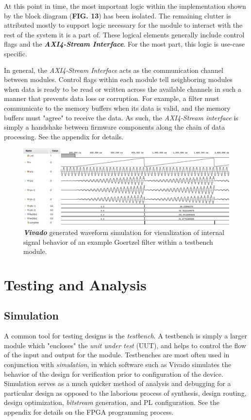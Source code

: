 \documentclass[reprint,amsmath,amssymb]{revtex4-2}
\begin{document}
At this point in time, the most important logic within the implementation shown by the block diagram (\textbf{FIG. 13}) has been isolated. The remaining clutter is attributed mostly to support logic necessary for the module to interact with the rest of the system it is a part of. These logical elements generally include control flags and the \textit{\textbf{AXI4-Stream Interface}}. For the most part, this logic is use-case specific.

In general, the \textit{AXI4-Stream Interface} acts as the communication channel between modules. Control flags within each module tell neighboring modules when data is ready to be read or written across the available channels in such a manner that prevents data loss or corruption. For example, a filter must communicate to the memory buffers when its data is valid, and the memory buffers must "agree" to receive the data. As such, the \textit{AXI4-Stream interface} is simply a handshake between firmware components along the chain of data processing. See the appendix for details. 

\begin{figure}[t!]
    \centering
    \includegraphics[width=\linewidth]{figs/goertzel_waveform0_inv.png}
    \caption{\textit{\textbf{Vivado}} generated waveform simulation for visualization of internal signal behavior of an example Goertzel filter within a testbench module.}
    \label{fig:15}
\end{figure}

\section{Testing and Analysis}

\subsection{Simulation}

A common tool for testing designs is the \textit{testbench}. A testbench is simply a larger module which "encloses" the \textit{unit under test} (UUT), and helps to control the flow of the input and output for the module. Testbenches are most often used in conjunction with \textit{simulation}, in which software such as Vivado simulates the behavior of the design for verification prior to configuration of the device. Simulation serves as a much quicker method of analysis and debugging for a particular design as opposed to the laborious process of synthesis, design routing, design optimization, \textit{bitstream} generation, and PL configuration. See the appendix for details on the FPGA programming process.
\end{document}
